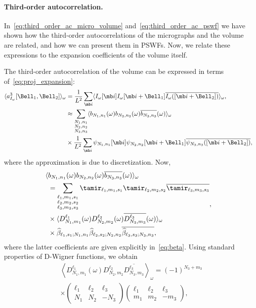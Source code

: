 \documentclass[9pt,twocolumn,twoside,lineno]{pnas-new}
\begin{document}
\paragraph{Third-order autocorrelation.}
In~\eqref{eq:third_order_ac_micro_volume} and~\eqref{eq:third_order_ac_pswf} we have shown how the third-order autocorrelations of the micrographs and the volume are related, and how we can present them in PSWFs. Now, we relate these expressions to the expansion coefficients of the volume itself.

The third-order autocorrelation of the volume can be expressed in terms of~\eqref{eq:proj_expansion}:
\begin{align} \label{eq:third_order_ac_volume}
\langle
a^3_{I_{\omega}}[\Bell_1, \Bell_2]\rangle_{\omega} &= \frac{1}{L^2}\sum_{\mb i}\langle I_{\omega}[\mb i]I_{\omega}[\mb i+\Bell_1]\overline{I_{\omega}([\mb i+\Bell_2])}\rangle_{\omega},\\
&\approx \sum_{\substack{N_1,n_1\\N_2,n_2\\N_3,n_3}} \langle b_{N_1,n_1}(\omega)b_{N_2,n_2}(\omega)\overline{b_{N_3,n_3}}(\omega)\rangle_{\omega}\nonumber\\&\times \frac{1}{L^2}\sum_{\mb i}\psi_{N_1,n_1}[\mb i]\psi_{N_2,n_2}[\mb i+\Bell_1]\overline{\psi_{N_3,n_3}([\mb i+\Bell_2])},\nonumber\end{align}
where the approximation is due to discretization. 
Now,
\[\begin{aligned} \langle &b_{N_1,n_1}(\omega)b_{N_2,n_2}(\omega)\overline{b_{N_3,n_3}}(\omega)\rangle_{\omega} \\&= \sum_{\substack{\ell_1,m_1,s_1\\\ell_2,m_2,s_2\\\ell_3,m_3,s_3}}\tamir_{\ell_1,m_1,s_1}\tamir_{\ell_2,m_2,s_2}\overline{\tamir_{\ell_3,m_3,s_3}}\\&\times \langle D_{N_1,m_1}^{\ell_1}(\omega)D_{N_2,m_2}^{\ell_2}(\omega)\overline{D_{N_3,m_3}^{\ell_3}}(\omega)\rangle_{\omega}\\
&\times \widehat\beta_{\ell_1,s_1;N_1,n_1}\widehat\beta_{\ell_2,s_2;N_2,n_2}\overline{\widehat\beta_{\ell_3,s_3;N_3,n_3}},\end{aligned},\]
where the latter coefficients are given explicitly in~\eqref{eq:beta}. Using standard properties of D-Wigner functions, we obtain  
\begin{align*}
&\left\langle D_{N_1,m_1}^{\ell_1}(\omega)D_{N_2,m_2}^{\ell_2}\overline{D_{N_3,m_3}^{\ell_3}}\right\rangle_{\omega} = (-1)^{N_3+m_3}\\&\times \left(\begin{array}{ccc}\ell_1 & \ell_2  & \ell_3\\ N_1 & N_2 & -N_3\end{array}\right)\left(\begin{array}{ccc}\ell_1 & \ell_2  & \ell_3\\ m_1 & m_2 & -m_3\end{array}\right),\nonumber
\end{align*}
\end{document}

